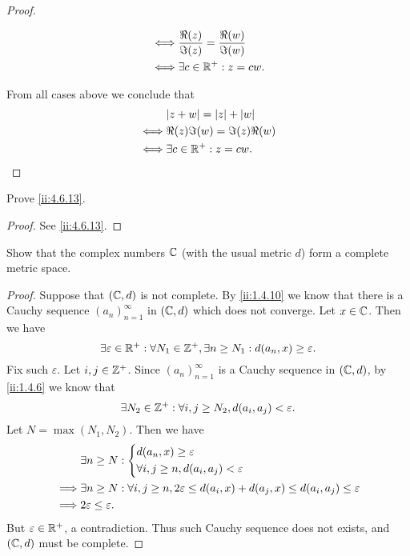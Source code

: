 \begin{proof}
\begin{itemize}
\begin{align*}
            \iff & \dfrac{\Re(z)}{\Im(z)} = \dfrac{\Re(w)}{\Im(w)} \\
            \iff & \exists c \in \mathbb{R}^+ : z = cw.
          \end{align*}
  \end{itemize}
  From all cases above we conclude that
  \begin{align*}
         & \abs{z + w} = \abs{z} + \abs{w} \\
    \iff & \Re(z) \Im(w) = \Im(z) \Re(w)   \\
    \iff & \exists c \in \R^+ : z = cw.
  \end{align*}
\end{proof}

\begin{ex}\label{ii:ex:4.6.9}
  Prove \cref{ii:4.6.13}.
\end{ex}

\begin{proof}
  See \cref{ii:4.6.13}.
\end{proof}

\begin{ex}\label{ii:ex:4.6.10}
  Show that the complex numbers \(\mathbb{C}\) (with the usual metric \(d\)) form a complete metric space.
\end{ex}

\begin{proof}
  Suppose that \((\mathbb{C}, d)\) is not complete.
  By \cref{ii:1.4.10} we know that there is a Cauchy sequence \((a_n)_{n = 1}^\infty\) in \((\mathbb{C}, d)\) which does not converge.
  Let \(x \in \mathbb{C}\).
  Then we have
  \[
    \exists \varepsilon \in \mathbb{R}^+ : \forall N_1 \in \mathbb{Z}^+, \exists n \geq N_1 : d(a_n, x) \geq \varepsilon.
  \]
  Fix such \(\varepsilon\).
  Let \(i, j \in \mathbb{Z}^+\).
  Since \((a_n)_{n = 1}^\infty\) is a Cauchy sequence in \((\mathbb{C}, d)\), by \cref{ii:1.4.6} we know that
  \[
    \exists N_2 \in \mathbb{Z}^+ : \forall i, j \geq N_2, d(a_i, a_j) < \varepsilon.
  \]
  Let \(N = \max(N_1, N_2)\).
  Then we have
  \begin{align*}
             & \exists n \geq N : \begin{dcases}
                                    d(a_n, x) \geq \varepsilon \\
                                    \forall i, j \geq n, d(a_i, a_j) < \varepsilon
                                  \end{dcases}                                                  \\
    \implies & \exists n \geq N : \forall i, j \geq n, 2\varepsilon \leq d(a_i, x) + d(a_j, x) \leq d(a_i, a_j) \leq \varepsilon \\
    \implies & 2\varepsilon \leq \varepsilon.
  \end{align*}
  But \(\varepsilon \in \mathbb{R}^+\), a contradiction.
  Thus such Cauchy sequence does not exists, and \((\mathbb{C}, d)\) must be complete.
\end{proof}

